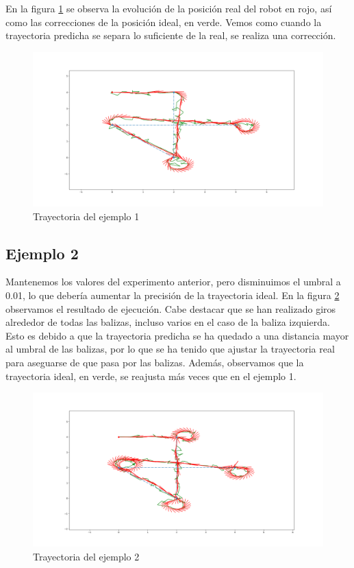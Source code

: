 \bigskip En la figura \ref{fig:localizacion_ej3} se observa la evolución de la posición real del robot en rojo, así como las correcciones de la posición ideal, en verde. Vemos como cuando la trayectoria predicha se separa lo suficiente de la real, se realiza una corrección.

\begin{figure}[htb]
  \centering
  \includegraphics[width=1\linewidth]{images/localizacion9.png}
  \caption{Trayectoria del ejemplo 1}
  \label{fig:localizacion_ej3}
\end{figure}

\subsection{Ejemplo 2}
Mantenemos los valores del experimento anterior, pero disminuimos el umbral a 0.01, lo que debería aumentar la precisión de la trayectoria ideal. En la figura \ref{fig:localizacion_ej4} observamos el resultado de ejecución. Cabe destacar que se han realizado giros alrededor de todas las balizas, incluso varios en el caso de la baliza izquierda. Esto 
es debido a que la trayectoria predicha se ha quedado a una distancia mayor al umbral de las balizas, por lo que se ha tenido que ajustar la trayectoria real para aseguarse de que pasa por las balizas. Además, observamos que la trayectoria ideal, en verde, se reajusta más veces que en el ejemplo 1.
\begin{figure}[htb]
  \centering
  \includegraphics[width=1\linewidth]{images/localizacion10.png}
  \caption{Trayectoria del ejemplo 2}
  \label{fig:localizacion_ej4}
\end{figure}

